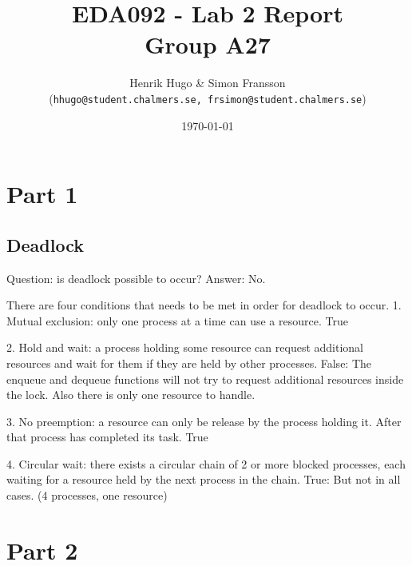 \documentclass[a4paper,11pt,twoside,fleqn]{article}
\title{	
\normalfont \normalsize 
\huge EDA092 - Lab 2 Report \\ Group A27 \\ %
}
\author{Henrik Hugo \& Simon Fransson \\ (\texttt{hhugo@student.chalmers.se, frsimon@student.chalmers.se})} %
\date{\normalsize\today} %
\begin{document}
\maketitle %


\section*{Part 1}


\subsection*{Deadlock}

Question: is deadlock possible to occur? Answer: No.

There are four conditions that needs to be met in order for deadlock to occur.
1. Mutual exclusion: only one process at a time can use a resource.
True

2. Hold and wait: a process holding some resource can request additional resources and wait for them if they are held by other processes.
False: The enqueue and dequeue functions will not try to request additional resources inside the lock. Also there is only one resource to handle.

3. No preemption: a resource can only be release by the process holding it. After that process has completed its task.
True

4. Circular wait: there exists a circular chain of 2 or more blocked processes, each waiting for a resource held by the next process in the chain.
True: But not in all cases. (4 processes, one resource) 

\clearpage


\section*{Part 2}

\end{document}
